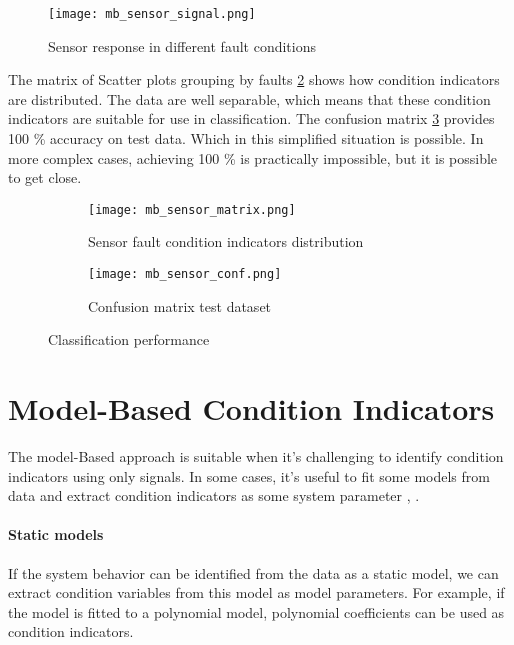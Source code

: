 \begin{figure}[h!]
    \centering
    \texttt{[image: mb\_sensor\_signal.png]}
    \caption{Sensor response in different fault conditions}
    \label{fig:mb_sensor_faults_signal}
\end{figure}


The matrix of Scatter plots grouping by faults \ref{fig:mb_sensor_matrix}
shows how condition indicators are distributed. The data are well
separable, which means that these condition indicators are suitable for use
in classification. The confusion matrix \ref{fig:mb_sensor_conf} provides
100 \% accuracy on test data. Which in this simplified situation is
possible. In more complex cases, achieving 100 \% is practically
impossible, but it is possible to get close.

\begin{figure}
    \centering
    \begin{subfigure}[b]{0.45\textwidth}
        \centering
        \texttt{[image: mb\_sensor\_matrix.png]}
        \caption{Sensor fault condition indicators distribution}
        \label{fig:mb_sensor_matrix}
    \end{subfigure}
    \hfill
    \begin{subfigure}[b]{0.45\textwidth}
        \centering
        \texttt{[image: mb\_sensor\_conf.png]}
        \caption{Confusion matrix test dataset}
        \label{fig:mb_sensor_conf}
    \end{subfigure}
    \caption{Classification performance}
    \label{fig:sensor_fault_final}
\end{figure}



\section{Model-Based Condition Indicators}
The model-Based approach is suitable when it's challenging to identify
condition indicators using only signals. In some cases, it's useful to fit
some models from data and extract condition indicators as some system
parameter \cite{matlab_full}, \cite{fdi_cern2}.

\paragraph{Static models}
If the system behavior can be identified from the data as a static model,
we can extract condition variables from this model as model parameters. For
example, if the model is fitted to a polynomial model, polynomial
coefficients can be used as condition indicators.

